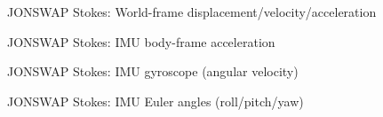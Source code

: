 \documentclass[11pt,letterpaper]{article}
\begin{document}
    \begin{figure}[H]\centering
    \resizebox{\textwidth}{!}{}
    \caption{JONSWAP Stokes: World-frame displacement/velocity/acceleration}
    \label{fig:jonswap_world}
    \end{figure}

    \begin{figure}[H]\centering
    \resizebox{\textwidth}{!}{}
    \caption{JONSWAP Stokes: IMU body-frame acceleration}
    \label{fig:jonswap_imu_acc}
    \end{figure}

    \begin{figure}[H]\centering
    \resizebox{\textwidth}{!}{}
    \caption{JONSWAP Stokes: IMU gyroscope (angular velocity)}
    \label{fig:jonswap_imu_gyro}
    \end{figure}

    \begin{figure}[H]\centering
    \resizebox{\textwidth}{!}{}
    \caption{JONSWAP Stokes: IMU Euler angles (roll/pitch/yaw)}
    \label{fig:jonswap_euler}
    \end{figure}
\end{document}
